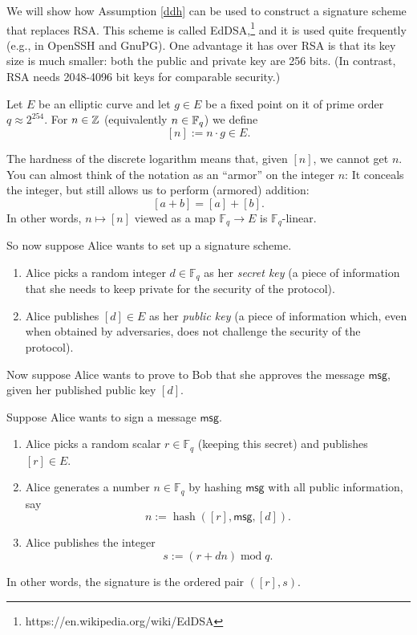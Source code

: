 We will show how Assumption \ref{ddh} can be used to construct a
signature scheme that replaces RSA. This scheme is called
EdDSA,\footnote{https://en.wikipedia.org/wiki/EdDSA} and it is used
quite frequently (e.g., in OpenSSH and GnuPG). One advantage it has over
RSA is that its key size is much smaller: both the public and private
key are 256 bits. (In contrast, RSA needs 2048-4096 bit keys for
comparable security.)

\begin{definition}
\label{armor}
Let $E$ be an elliptic curve and let $g \in E$
be a fixed point on it of prime order $q \approx 2^{254}$.
For $n \in \mathbb{Z}$ (equivalently $n \in \mathbb{F}_q$) we define
\[ [n] := n \cdot g \in E. \]
\end{definition}

The hardness of the discrete logarithm means that, given
\([ n]\), we cannot get \(n\). You can almost think of the
notation as an ``armor'' on the integer \(n\): It conceals the integer,
but still allows us to perform (armored) addition:
\[[ a + b] = [ a] + [ b].\] In other
words, \(n \mapsto [ n]\) viewed as a map
\({\mathbb{F}}_{q} \rightarrow E\) is \({\mathbb{F}}_{q}\)-linear.

So now suppose Alice wants to set up a signature scheme.

\begin{algo}
\leavevmode
\begin{enumerate}
\item
  Alice picks a random integer \(d \in {\mathbb{F}}_{q}\) as her
  \emph{secret key} (a piece of information that she needs to keep
  private for the security of the protocol).
\item
  Alice publishes \([ d] \in E\) as her \emph{public key} (a
  piece of information which, even when obtained by adversaries, does
  not challenge the security of the protocol).
\end{enumerate}
\end{algo}

Now suppose Alice wants to prove to Bob that she approves the message
\(\textsf{msg}\), given her published public key
\([ d]\).

\begin{algo}
\leavevmode
Suppose Alice wants to sign a message
\(\textsf{msg}\).

\begin{enumerate}
\item
  Alice picks a random scalar \(r \in {\mathbb{F}}_{q}\) (keeping this
  secret) and publishes \([ r] \in E\).
\item
  Alice generates a number \(n \in {\mathbb{F}}_{q}\) by hashing
  \(\textsf{msg}\) with all public information, say
  \[n := \operatorname{hash}([ r],\textsf{msg},[ d]).\]
\item
  Alice publishes the integer \[s := (r + dn)\operatorname{mod}q.\]
\end{enumerate}

In other words, the signature is the ordered pair
\(( [ r],s )\).
\end{algo}

